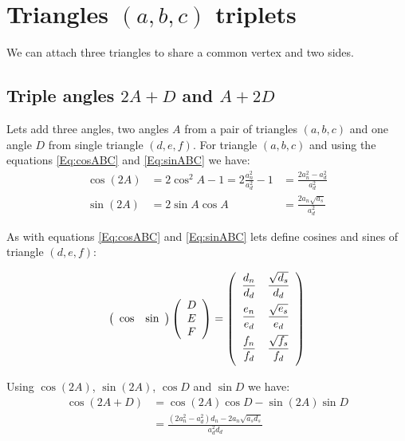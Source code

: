 \documentclass[11pt]{article}
\begin{document}
\section{Triangles $(a,b,c)$ triplets}

We can attach three triangles to share a common vertex and two sides.

\subsection{Triple angles $2A+D$ and $A+2D$}

Lets add three angles, two angles $A$ from a pair of triangles $(a,b,c)$ and one angle $D$ from single triangle $(d,e,f)$.
For triangle $(a,b,c)$ and using the equations \ref{Eq:cosABC} and \ref{Eq:sinABC} we have:
\begin{align}
\cos{(2A)} &= 2\cos^2{A} - 1 = 2\frac{a_n^2}{a_d^2} - 1 &= \frac{2a_n^2 - a_d^2}{a_d^2}\\
\sin{(2A)} &= 2\sin{A}\cos{A} &= \frac{2a_n\sqrt{a_s}}{a_d^2}
\end{align}

As with equations \ref{Eq:cosABC} and \ref{Eq:sinABC} lets define cosines and sines of triangle $(d,e,f)$:

\begin{equation}\label{Eq:cossinDEF}
\left({\begin{array}{c c} {\cos} & {\sin}\end{array}}\right)
\left({\begin{array}{c} D\\ E\\ F\\ \end{array}}\right)
= \left({\begin{array}{c c}
\dfrac{d_n}{d_d} & \dfrac{\sqrt{d_s}}{d_d}\\[10pt]
\dfrac{e_n}{e_d} & \dfrac{\sqrt{e_s}}{e_d}\\[10pt]
\dfrac{f_n}{f_d} & \dfrac{\sqrt{f_s}}{f_d}\\[10pt]
\end{array}}\right)
\end{equation}

Using $\cos{(2A)}$, $\sin{(2A)}$, $\cos{D}$ and $\sin{D}$ we have:
\begin{align}
\cos{(2A+D)} &= \cos{(2A)}\cos{D} - \sin{(2A)}\sin{D} \nonumber\\
 &= \frac{(2a_n^2 - a_d^2)d_n - 2a_n\sqrt{a_sd_s}}{a_d^2d_d}
\end{align}
\end{document}

